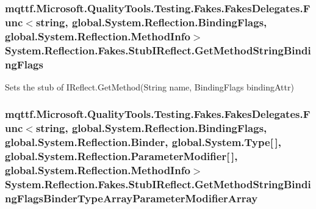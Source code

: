 \hypertarget{class_system_1_1_reflection_1_1_fakes_1_1_stub_i_reflect_a21c41e101c60ceac13405e44ef3f0a28}{
\subsubsection[{Get\-Method\-String\-Binding\-Flags}]{\setlength{\rightskip}{0pt plus 5cm}mqttf.\-Microsoft.\-Quality\-Tools.\-Testing.\-Fakes.\-Fakes\-Delegates.\-Func$<$string, global.\-System.\-Reflection.\-Binding\-Flags, global.\-System.\-Reflection.\-Method\-Info$>$ System.\-Reflection.\-Fakes.\-Stub\-I\-Reflect.\-Get\-Method\-String\-Binding\-Flags}}\label{class_system_1_1_reflection_1_1_fakes_1_1_stub_i_reflect_a21c41e101c60ceac13405e44ef3f0a28}


Sets the stub of I\-Reflect.\-Get\-Method(\-String name, Binding\-Flags binding\-Attr)

\hypertarget{class_system_1_1_reflection_1_1_fakes_1_1_stub_i_reflect_aabf22ba0c77ea6bf66d3b10959be0a8d}{
\subsubsection[{Get\-Method\-String\-Binding\-Flags\-Binder\-Type\-Array\-Parameter\-Modifier\-Array}]{\setlength{\rightskip}{0pt plus 5cm}mqttf.\-Microsoft.\-Quality\-Tools.\-Testing.\-Fakes.\-Fakes\-Delegates.\-Func$<$string, global.\-System.\-Reflection.\-Binding\-Flags, global.\-System.\-Reflection.\-Binder, global.\-System.\-Type\mbox{[}$\,$\mbox{]}, global.\-System.\-Reflection.\-Parameter\-Modifier\mbox{[}$\,$\mbox{]}, global.\-System.\-Reflection.\-Method\-Info$>$ System.\-Reflection.\-Fakes.\-Stub\-I\-Reflect.\-Get\-Method\-String\-Binding\-Flags\-Binder\-Type\-Array\-Parameter\-Modifier\-Array}}\label{class_system_1_1_reflection_1_1_fakes_1_1_stub_i_reflect_aabf22ba0c77ea6bf66d3b10959be0a8d}


